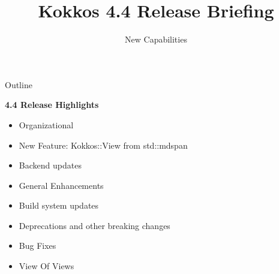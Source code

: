 
\usepackage{tikz}
\graphicspath{{4_0/figures/}}
\def\sandid{SANDXXXX PE}

\title{Kokkos 4.4 Release Briefing}

\author{New Capabilities}




\shorttrue
\mediumfalse
\fullfalse



\begin{frame}
        \titlepage
\end{frame}


\begin{frame}[fragile]{Outline}

\textbf{4.4 Release Highlights}

    \begin{itemize}
      \item{Organizational}
      \item{New Feature: Kokkos::View from std::mdspan}
      \item{Backend updates}
      \item{General Enhancements}
      \item{Build system updates}
      \item{Deprecations and other breaking changes}
      \item{Bug Fixes}
      \item{View Of Views}
    \end{itemize}

\end{frame}

